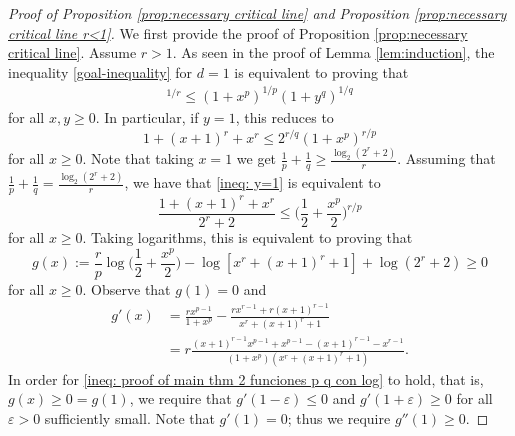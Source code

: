\documentclass[reqno, 10pt]{amsart}
\theoremstyle{plain}
\numberwithin{equation}{section}
\theoremstyle{definition}
\newtheorem*{induction hypothesis}{Induction hypothesis}
\theoremstyle{remark}
\begin{document}
\begin{proof}[Proof of Proposition \ref{prop:necessary critical line} and Proposition \ref{prop:necessary critical line r<1}]
We first provide the proof of Proposition \ref{prop:necessary critical line}. Assume $r>1$. As seen in the proof of Lemma \ref{lem:induction}, the inequality \eqref{goal-inequality} for $d=1$ is equivalent to proving that
\begin{align*}%
    [1+(x+y)^r+(xy)^r]^{1/r}\leq (1+x^p)^{1/p}(1+y^q)^{1/q}
\end{align*}
for all $x,y \geq 0$. In particular, if $y=1$, this reduces to
\begin{equation}\label{ineq: y=1}
1+(x+1)^r+ x^r\leq 2^{r/q}(1+x^p)^{r/p}
\end{equation}
for all $x \geq 0$. Note that taking $x=1$ we get $\frac{1}{p}+\frac{1}{q}\geq\frac{\log_{2}(2^r+2)}{r}$. 
Assuming that $\frac{1}{p}+\frac{1}{q}=\frac{\log_{2}(2^r+2)}{r}$, we have that \eqref{ineq: y=1} is equivalent to
\begin{equation*}
 \frac{1+(x+1)^r + x^r}{2^r+2}\leq \Big(\frac{1}{2}+\frac{x^p}{2}\Big)^{r/p}   
\end{equation*}
for all $x\geq 0$. Taking logarithms, this is equivalent to proving that
\begin{equation}\label{ineq: proof of main thm 2 funciones p q con log}
g(x):=\frac{r}{p}\log\Big(\frac{1}{2}+\frac{x^p}{2}\Big)-\log[x^r+(x+1)^r+1]+\log(2^r+2)\geq 0
\end{equation}
for all $x\geq0$. Observe that $g(1)=0$ and
\begin{align*}
g'(x) & =\frac{rx^{p-1}}{1+x^p}-\frac{rx^{r-1}+r(x+1)^{r-1}}{x^r+(x+1)^r+1} \\
& =r\frac{(x+1)^{r-1}x^{p-1}+x^{p-1}-(x+1)^{r-1}-x^{r-1}}{(1+x^p)(x^r+(x+1)^r+1)}.    
\end{align*}
In order for \eqref{ineq: proof of main thm 2 funciones p q con log} to hold, that is, $g(x) \geq 0=g(1)$, we require that $g'(1-\varepsilon) \leq 0$ and $g'(1+\varepsilon) \geq 0$ for all $\varepsilon>0$ sufficiently small. Note that $g'(1)=0$; thus we require $g''(1) \geq 0$. 


\end{proof}
\end{document}
